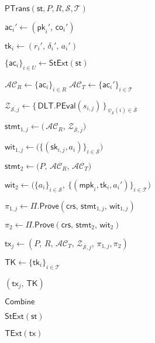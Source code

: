 \begin{minipage}[t]{0.49\textwidth}
\begin{algo}{$\mathsf{PTrans}(\mathsf{st},P,R,\mathcal{S},\mathcal{T})$}
{  $\mathsf{ac}_i' \gets (\mathsf{pk}_i',\, \mathsf{co}_i')$\;
  
  $\mathsf{tk}_i \gets (r_i',\, \delta_i',\, a_i')$\;
}

$\{\mathsf{ac}_i\}_{i\in U} \gets \mathsf{StExt}(\mathsf{st})$\;

$\mathcal{AC}_R \gets \{\mathsf{ac}_i\}_{i\in R}$\;
$\mathcal{AC}_T \gets \{\mathsf{ac}_i'\}_{i\in \mathcal{T}}$\;

$\mathcal{Z}_{\bar{\mathcal{S},j}} \gets \{\, \mathsf{DLT.PEval}(s_{i,j})\,\}_{\,\psi_{\mathcal{S}}(i)\in \bar{\mathcal{S}}}$\;

$\mathsf{stmt}_{1,j} \gets \big(\, \mathcal{AC}_R,\, \mathcal{Z}_{\bar{\mathcal{S}},j}\big)$\;

$\mathsf{wit}_{1,j} \gets \big( \{(\mathsf{sk}_{i,j},a_i)\}_{i\in \mathcal{S}}\big)$\;

$\mathsf{stmt}_2 \gets \big(P,\, \mathcal{AC}_R,\, \mathcal{AC}_T\big)$\;

$\mathsf{wit}_2 \gets \big( \{a_i\}_{i\in \mathcal{S}},\ \{(\mathsf{mpk}_i,\mathsf{tk}_i,a_i')\}_{i\in \mathcal{T}} \big)$\;

$\pi_{1,j} \gets \Pi.\mathsf{Prove}(\mathsf{crs},\, \mathsf{stmt}_{1,j},\, \mathsf{wit}_{1,j})$\;

$\pi_2 \gets \Pi.\mathsf{Prove}(\mathsf{crs},\, \mathsf{stmt}_2,\, \mathsf{wit}_2)$\;

$\mathsf{tx}_{j} \gets (P,\, R,\, \mathcal{AC}_T,\, \mathcal{Z}_{\bar{\mathcal{S}},j},\, \pi_{1,j},\pi_2)$\;

$\mathsf{TK} \gets \{\mathsf{tk}_i\}_{i\in \mathcal{T}}$\;

\Return $(\mathsf{tx}_j,\, \mathsf{TK})$\;
\end{algo}

\begin{algo}{$\mathsf{Combine}$}
\end{algo}

\begin{algo}{$\mathsf{StExt}(\mathsf{st})$}
\end{algo}

\begin{algo}{$\mathsf{TExt}(\mathsf{tx})$}
\end{algo}

\end{minipage}\hfill
